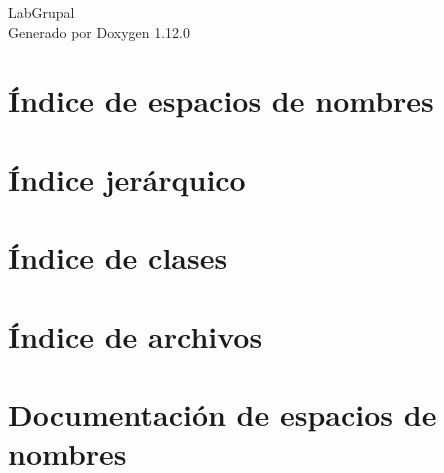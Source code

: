 \documentclass[twoside]{book}
\newcommand{\+}{\discretionary{\mbox{\scriptsize$\hookleftarrow$}}{}{}}
\newcommand{\clearemptydoublepage}{%
    \newpage{\pagestyle{empty}\cleardoublepage}%
  }
\begin{document}
  \raggedbottom
    \hypersetup{pageanchor=false,
                bookmarksnumbered=true,
                pdfencoding=unicode
               }
  \begin{titlepage}
  \vspace*{7cm}
  \begin{center}%
  {\Large Lab\+Grupal}\\
  \vspace*{1cm}
  {\large Generado por Doxygen 1.12.0}\\
  \end{center}
  \end{titlepage}
  \clearemptydoublepage
  \tableofcontents
  \clearemptydoublepage
  \hypersetup{pageanchor=true}
\chapter{Índice de espacios de nombres}

\chapter{Índice jerárquico}

\chapter{Índice de clases}

\chapter{Índice de archivos}

\chapter{Documentación de espacios de nombres}












\end{document}
